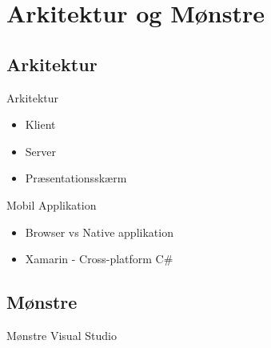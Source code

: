 \section{Arkitektur og Mønstre}

\subsection{Arkitektur}
\begin{frame}{Arkitektur}
	\begin{itemize}
		\item Klient
		\item Server
		\item Præsentationsskærm
	\end{itemize}
\end{frame}


\begin{frame}{Mobil Applikation}
	\begin{itemize}
		\item Browser vs Native applikation
		\item Xamarin - Cross-platform C\#
	\end{itemize}	
\end{frame}

\subsection{Mønstre}
\begin{frame}{Mønstre}
	Visual Studio
\end{frame}